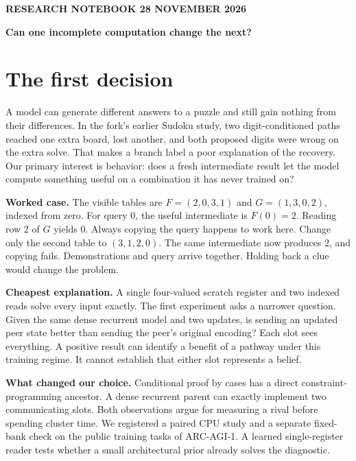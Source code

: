 \documentclass[11pt]{article}
\newcommand{\head}[1]{{\small\bfseries\color{ink} #1}\par}
\begin{document}
\head{RESEARCH NOTEBOOK \hfill 28 NOVEMBER 2026}
{\LARGE\bfseries Can one incomplete computation change the next?}\par
\section*{The first decision}
A model can generate different answers to a puzzle and still gain nothing from their differences. In the fork's earlier Sudoku study, two digit-conditioned paths reached one extra board, lost another, and both proposed digits were wrong on the extra solve. That makes a branch label a poor explanation of the recovery. Our primary interest is behavior: does a fresh intermediate result let the model compute something useful on a combination it has never trained on?
\par
\textbf{Worked case.} The visible tables are $F=(2,0,3,1)$ and $G=(1,3,0,2)$, indexed from zero. For query 0, the useful intermediate is $F(0)=2$. Reading row 2 of $G$ yields 0. Always copying the query happens to work here. Change only the second table to $(3,1,2,0)$. The same intermediate now produces 2, and copying fails. Demonstrations and query arrive together. Holding back a clue would change the problem.
\par
\textbf{Cheapest explanation.} A single four-valued scratch register and two indexed reads solve every input exactly. The first experiment asks a narrower question. Given the same dense recurrent model and two updates, is sending an updated peer state better than sending the peer's original encoding? Each slot sees everything. A positive result can identify a benefit of a pathway under this training regime. It cannot establish that either slot represents a belief.
\par
\textbf{What changed our choice.} Conditional proof by cases has a direct constraint-programming ancestor. A dense recurrent parent can exactly implement two communicating slots. Both observations argue for measuring a rival before spending cluster time. We registered a paired CPU study and a separate fixed-bank check on the public training tasks of ARC-AGI-1. A learned single-register reader tests whether a small architectural prior already solves the diagnostic.
\par

\newpage
\end{document}
